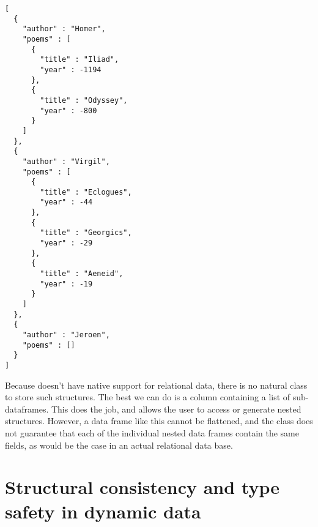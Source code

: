 \begin{knitrout}\mycodesize
{}\color{fgcolor}\begin{kframe}
\begin{alltt}
 \hlkwb{<-} \hlstd{(} \hlstd{=} \hlstd{(}\hlstd{,} \hlstd{,} \hlstd{))}
\hlopt{$} \hlkwb{<-} \hlstd{(}
  \hlstd{(}\hlstd{=}\hlstd{(}\hlstd{,} \hlstd{),} \hlstd{=}\hlstd{(}\hlopt{-}\hlstd{,} \hlopt{-}\hlstd{)),}
  \hlstd{(}\hlstd{=}\hlstd{(}\hlstd{,} \hlstd{,} \hlstd{),} \hlstd{=}\hlstd{(}\hlopt{-}\hlstd{,} \hlopt{-}\hlstd{,} \hlopt{-}\hlstd{)),}
  \hlstd{()}
\hlstd{)}
\hlstd{(} \hlstd{=}\hlstd{))}
\end{alltt}
\begin{verbatim}
[
  {
    "author" : "Homer",
    "poems" : [
      {
        "title" : "Iliad",
        "year" : -1194
      },
      {
        "title" : "Odyssey",
        "year" : -800
      }
    ]
  },
  {
    "author" : "Virgil",
    "poems" : [
      {
        "title" : "Eclogues",
        "year" : -44
      },
      {
        "title" : "Georgics",
        "year" : -29
      },
      {
        "title" : "Aeneid",
        "year" : -19
      }
    ]
  },
  {
    "author" : "Jeroen",
    "poems" : []
  }
]
\end{verbatim}
\end{kframe}
\end{knitrout}


 Because \R doesn't have native support for relational data, there is no natural class to store such structures. The best we can do is a column containing a list of sub-dataframes. This does the job, and allows the \R user to access or generate nested \JSON structures. However, a data frame like this cannot be flattened, and the class does not guarantee that each of the individual nested data frames contain the same fields, as would be the case in an actual relational data base. 


\section{Structural consistency and type safety in dynamic data}

